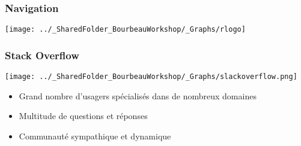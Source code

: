 \documentclass{beamer}
\begin{document}

    \begin{frame}
    
      \frametitle{Navigation} \vspace{1cm}
      
          \begin{center}
          
        \texttt{[image: ../\_SharedFolder\_BourbeauWorkshop/\_Graphs/rlogo]}

          \end{center}
          
    \end{frame}


    \begin{frame}
    
      \frametitle{Stack Overflow} \vspace{1cm}
      
        \begin{center}
          
        \texttt{[image: ../\_SharedFolder\_BourbeauWorkshop/\_Graphs/slackoverflow.png]}

         \end{center}
          
        \begin{itemize}
         \item Grand nombre d'usagers spécialisés dans de nombreux domaines
         \item Multitude de questions et réponses
         \item Communauté sympathique et dynamique
            
        \end{itemize}
          
    \end{frame}

\end{document}
